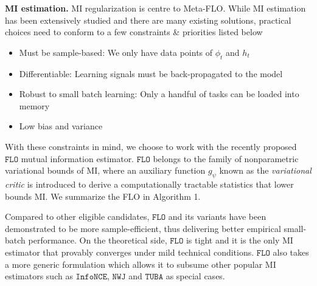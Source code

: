 \documentclass[nohyperref]{article}
\theoremstyle{plain}
\theoremstyle{definition}
\theoremstyle{remark}
\newcommand{\infonce}{\texttt{InfoNCE}}
\newcommand{\TUBA}{\texttt{TUBA}}
\newcommand{\NWJ}{\texttt{NWJ}}
\newcommand{\FLO}{\texttt{FLO}}
\begin{document}
{\bf MI estimation.} MI regularization is centre to Meta-FLO. While MI estimation has been extensively studied and there are many existing solutions, practical choices need to conform to a few constraints \& priorities listed below
\begin{itemize}
\item Must be sample-based: We only have data points of $\phi_t$ and $h_t$%
\item Differentiable: Learning signals must be back-propagated to the model
\item Robust to small batch learning: Only a handful of tasks can be loaded into memory
\item Low bias and variance
\end{itemize} 
With these constraints in mind, we choose to work with the recently proposed $\FLO$ mutual information estimator. $\FLO$ belongs to the family of nonparametric variational bounds of MI, where an auxiliary function $g_{\psi}$ known as the {\it variational critic} is introduced to derive a computationally tractable statistics that lower bounds MI. We summarize the FLO in Algorithm 1. 


Compared to other eligible candidates, $\FLO$ and its variants have been demonstrated to be more sample-efficient, thus delivering better empirical small-batch performance. On the theoretical side, $\FLO$ is tight and it is the only MI estimator that provably converges under mild technical conditions. $\FLO$ also takes a more generic formulation which allows it to subsume other popular MI estimators such as $\infonce$, $\NWJ$ and $\TUBA$ as special cases.  
\end{document}
